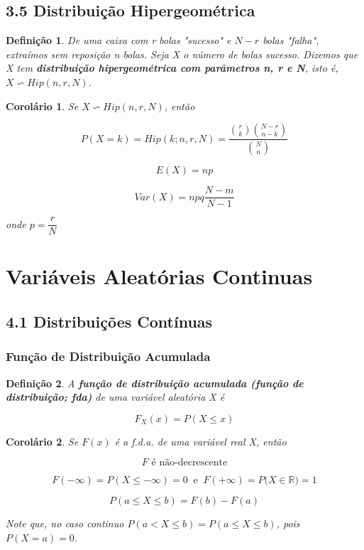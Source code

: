 \documentclass[12pt]{article}
\newtheorem{corollary}{Corolário}[theorem]
\newtheorem{definition}{Definição}
\begin{document}
\subsection*{3.5 Distribuição Hipergeométrica}
\begin{definition}
    De uma caixa com r bolas "sucesso" e $N-r$ bolas "falha", extraímos sem reposição n bolas. Seja X o número de bolas sucesso. Dizemos que X tem \textbf{distribuição hipergeométrica com parâmetros n, r e N}, isto é, $X \backsim Hip (n, r, N)$.
\end{definition}
    
\begin{corollary}
    Se $X \backsim Hip (n, r, N)$, então
    
    $$P(X = k) = Hip (k; n, r, N) = \dfrac{{r \choose k}{N-r \choose n-k}}{{N \choose n}}$$
    
    $$E(X) = n p$$
    
    $$Var(X) = n p q \frac{N - m}{N -1}$$
    
    onde $p = \dfrac{r}{N}$
\end{corollary}

\section{Variáveis Aleatórias Continuas}
\subsection*{4.1 Distribuições Contínuas}
\subsubsection*{Função de Distribuição Acumulada}

\begin{definition}
    A \textbf{função de distribuição acumulada (função de distribuição; fda)} de uma variável aleatória X é
    
    $$F_X(x) = P(X \leq x)$$
\end{definition}

\begin{corollary}
    Se $F(x)$ é a f.d.a. de uma variável real X, então
    
    $$F \text{ é não-decrescente}$$
    
    $$F(- \infty) = P(X \leq - \infty) = 0 \ \text{ e } \ F(+\infty) = P(X \in \mathbb{R)} = 1$$
    
    $$P(a \leq X \leq b) = F(b) - F(a)$$
    
    Note que, no caso continuo $P(a < X \leq b) = P(a \leq X \leq b)$, pois $P(X = a) = 0$.
\end{corollary}
\end{document}
